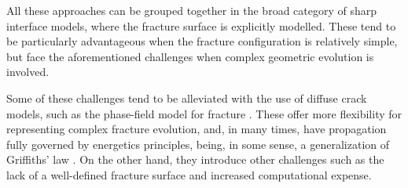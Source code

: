     All these approaches can be grouped together in the broad category of sharp interface models, where the fracture surface is explicitly modelled. These tend to be particularly advantageous when the fracture configuration is relatively simple, but face the aforementioned challenges when complex geometric evolution is involved. 
    
    Some of these challenges tend to be alleviated with the use of diffuse crack models, such as the phase-field model for fracture \cite{francfort1998revisiting, bourdin2000numerical, karma2001phase}. These offer more flexibility for representing complex fracture evolution, and, in many times, have propagation fully governed by energetics principles, being, in some sense, a generalization of Griffiths' law \cite{griffith1921vi}. On the other hand, they introduce other challenges such as the lack of a well-defined fracture surface and increased computational expense\cite{heider2021review}.  






